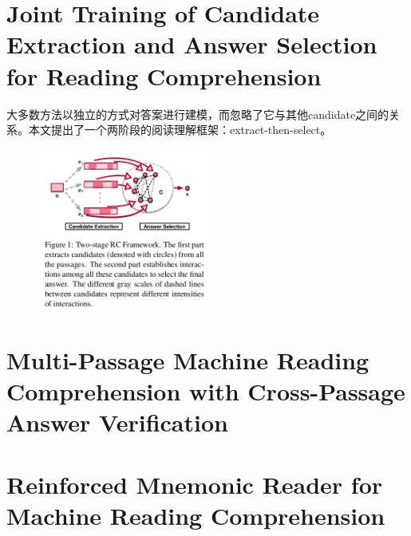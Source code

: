 \documentclass[a4paper,UTF8]{article}
\numberwithin{equation}{section}
\begin{document}
\section{Joint Training of Candidate Extraction and Answer Selection for Reading Comprehension}
大多数方法以独立的方式对答案进行建模，而忽略了它与其他candidate之间的关系。本文提出了一个两阶段的阅读理解框架：extract-then-select。
\begin{figure}[H]
	\centering
	\includegraphics[width=0.5\textwidth]{12-1.png}
\end{figure}
\begin{figure}[htbp]
	\centering

	\quad
	\quad
\end{figure}

\newpage
\section{Multi-Passage Machine Reading Comprehension with Cross-Passage Answer Verification}

\newpage
\section{Reinforced Mnemonic Reader for Machine Reading Comprehension}
\end{document}
